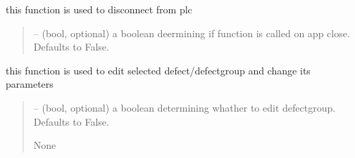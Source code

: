 \documentclass[letterpaper,10pt,english]{sphinxmanual}
\begin{document}
\begin{savenotes}
\begin{fulllineitems}
\begin{savenotes}
\begin{fulllineitems}
\end{fulllineitems}\end{savenotes}


\begin{savenotes}\begin{fulllineitems}
\label{\detokenize{setting/setting_api:oxin.setting_api.API.disconnect_plc}}
\pysigstartsignatures
{}
\pysigstopsignatures
\sphinxAtStartPar
this function is used to disconnect from plc
\begin{quote}\begin{description}
\sphinxAtStartPar
{} – (bool, optional) a boolean deermining if function is called on app close. Defaults to False.

\end{description}\end{quote}

\end{fulllineitems}\end{savenotes}


\begin{savenotes}\begin{fulllineitems}
\label{\detokenize{setting/setting_api:oxin.setting_api.API.edit_defects}}
\pysigstartsignatures
{}
\pysigstopsignatures
\sphinxAtStartPar
this function is used to edit selected defect/defect\sphinxhyphen{}group and change its parameters
\begin{quote}\begin{description}
\sphinxAtStartPar
{} – (bool, optional) a boolean determining whather to edit defect\sphinxhyphen{}group. Defaults to False.

\sphinxAtStartPar
None

\end{description}\end{quote}


\end{fulllineitems}
\end{savenotes}
\end{fulllineitems}
\end{savenotes}
\end{document}
